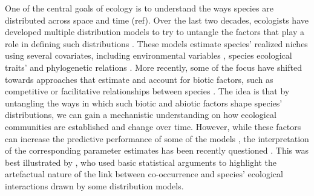 \documentclass[11pt, a4paper]{article}
\begin{document}


One of the central goals of ecology is to understand the ways species are distributed across space and time (ref). Over the last two decades, ecologists have developed multiple distribution models to try to untangle the factors that play a role in defining such distributions \citep{guisanPredictiveHabitatDistribution2000}. These models estimate species' realized niches using several covariates, including environmental variables \citep{guisanPredictingSpeciesDistribution2005}, species ecological traits' \citep{pollockRoleFunctionalTraits2012} and phylogenetic relations \citep{ivesGeneralizedLinearMixed2011}. More recently, some of the focus have shifted towards approaches that estimate and account for biotic factors, such as competitive or facilitative relationships between species \citep{ovaskainenHowMakeMore2017}. The idea is that by untangling the ways in which such biotic and abiotic factors shape species' distributions, we can gain a mechanistic understanding on how ecological communities are established and change over time. However, while these factors can increase the predictive performance of some of the models \citep{norbergComprehensiveEvaluationPredictive2019}, the interpretation of the corresponding parameter estimates has been recently questioned \citep{harrisInferringSpeciesInteractions2016, thurmanTestingLinkSpecies2019, poggiatoInterpretationsJointModeling2021}. This was best illustrated by \citet{blanchetCooccurrenceNotEvidence2020}, who used basic statistical arguments to highlight the artefactual nature of the link between co-occurrence and species' ecological interactions drawn by some distribution models.
\end{document}
